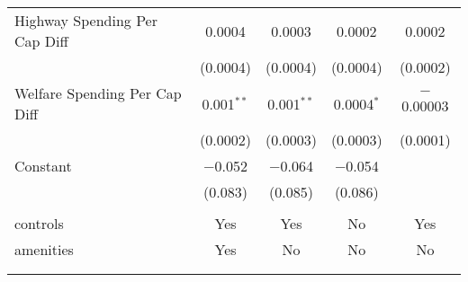 \begin{table}[!htbp]
\begin{tabular}{@{\extracolsep{5pt}}lcccc}
  Highway Spending Per Cap Diff & 0.0004 & 0.0003 & 0.0002 & 0.0002 \\ 
  & (0.0004) & (0.0004) & (0.0004) & (0.0002) \\ 
  Welfare Spending Per Cap Diff & 0.001$^{**}$ & 0.001$^{**}$ & 0.0004$^{*}$ & $-$0.00003 \\ 
  & (0.0002) & (0.0003) & (0.0003) & (0.0001) \\ 
  Constant & $-$0.052 & $-$0.064 & $-$0.054 &  \\ 
  & (0.083) & (0.085) & (0.086) &  \\ 
 \hline \\[-1.8ex] 
controls & Yes & Yes & No & Yes \\ 
amenities & Yes & No & No & No \\ 
\hline \\[-1.8ex] 
\hline 
\hline \\[-1.8ex] 
\end{tabular} 
\end{table} 
